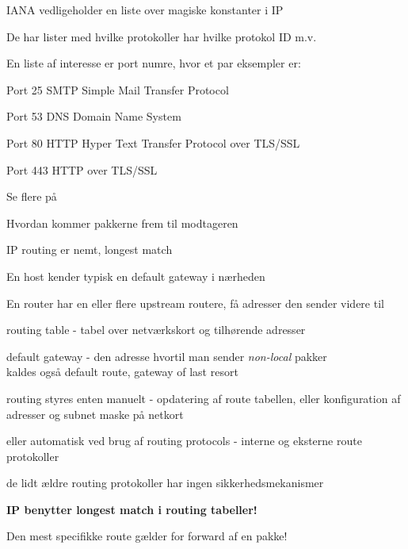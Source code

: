 \documentclass[Screen16to9,17pt]{foils}
\begin{document}


\begin{list1}
\item IANA vedligeholder en liste over magiske konstanter i IP
\item De har lister med hvilke protokoller har hvilke protokol ID m.v.
\item En liste af interesse er port numre, hvor et par eksempler er:
\begin{list2}
\item Port 25 SMTP Simple Mail Transfer Protocol
\item Port 53 DNS Domain Name System
\item Port 80 HTTP Hyper Text Transfer Protocol over TLS/SSL
\item Port 443 HTTP over TLS/SSL
\end{list2}
\item Se flere på 
\end{list1}


Hvordan kommer pakkerne frem til modtageren



\begin{list1}
\item IP routing er nemt, longest match
\item En host kender typisk en default gateway i nærheden
\item En router har en eller flere upstream routere, få adresser den sender videre til
\end{list1}



\begin{list1}
  \item routing table - tabel over netværkskort og tilhørende adresser
\item default gateway - den adresse hvortil man sender
  \emph{non-local} pakker\\kaldes også default route, gateway of last
  resort
\item routing styres enten manuelt - opdatering af route tabellen,
  eller konfiguration af adresser og subnet maske på netkort
\item eller automatisk ved brug af routing protocols - interne og
  eksterne route protokoller
\item de lidt ældre routing protokoller har ingen sikkerhedsmekanismer
\item {\bf IP benytter longest match i routing tabeller!}
\item Den mest specifikke route gælder for forward af en pakke!
\end{list1}
\end{document}
